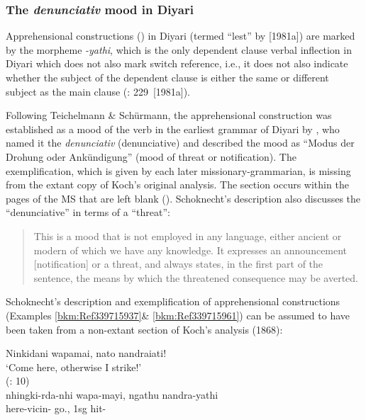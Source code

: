 \subsubsection{The \textit{denunciativ} mood in Diyari}
\label{sec:key:8.7.3.1}\label{bkm:Ref339789035}

Apprehensional constructions () in Diyari (termed “lest” by \citealt{austin_grammar_2013} [1981a]) are marked by the morpheme \textit{-yathi}, which is the only dependent clause verbal inflection in Diyari which does not also mark switch reference, i.e., it does not also indicate whether the subject of the dependent clause is either the same or different subject as the main clause (\citealt{austin_grammar_2013}: 229~[1981a]).

Following Teichelmann \& Schürmann, the apprehensional construction was established as a mood of the verb in the earliest grammar of Diyari by \citet[no pag.]{koch_untitled_1868}, who named it the \textit{denunciativ} (denunciative) and described the mood as “Modus der Drohung oder Ankündigung” (mood of threat or notification). The exemplification, which is given by each later missionary-grammarian, is missing from the extant copy of Koch’s original analysis. The section occurs within the pages of the MS that are left blank (). Schoknecht’s description also discusses the “denunciative” in terms of a “threat'':

\begin{quote}
This is a mood that is not employed in any language, either ancient or modern of which we have any knowledge. It expresses an announcement [notification] or a threat, and always states, in the first part of the sentence, the means by which the threatened consequence may be averted. \citep[10]{schoknecht_grammar_1947}
\end{quote}

Schoknecht’s description and exemplification of apprehensional constructions (Examples \ref{bkm:Ref339715937}\& \ref{bkm:Ref339715961}) can be assumed to have been taken from a non-extant section of Koch’s analysis (1868):

\newpage
\ea\label{bkm:Ref339715937}
Ninkidani wapamai, nato nandraiati!\\
\glt `Come here, otherwise I strike!' \\
(\citealt{schoknecht_grammar_1947}: 10) \\
\gll nhingki-rda-nhi wapa-mayi, ngathu nandra-yathi \\
here-vicin- go., 1sg hit-\\
\z

